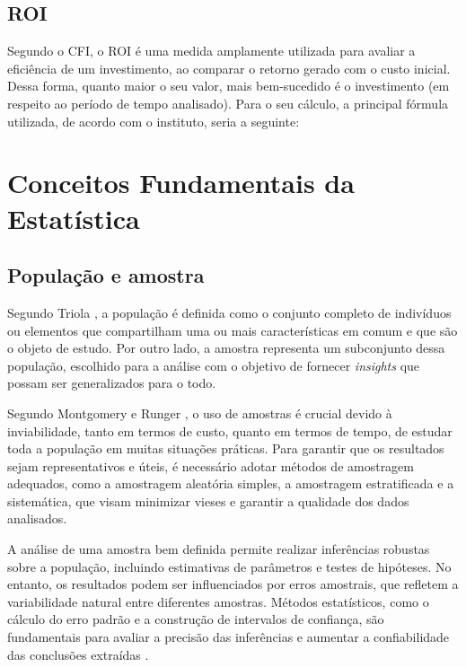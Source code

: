 %

\subsection{\acrfull{ROI}}
Segundo o \acrfull{CFI}\cite{cfiRoi}, o \acrshort{ROI} é uma medida amplamente utilizada para avaliar a eficiência de um investimento, ao comparar o retorno gerado com o custo inicial. Dessa forma, quanto maior o seu valor, mais bem-sucedido é o investimento (em respeito ao período de tempo analisado). Para o seu cálculo, a principal fórmula utilizada, de acordo com o instituto, seria a seguinte:

%

\section{Conceitos Fundamentais da Estatística}
\subsection{População e amostra}
Segundo Triola \cite{triola2018introducao}, a população é definida como o conjunto completo de indivíduos ou elementos que compartilham uma ou mais características em comum e que são o objeto de estudo. Por outro lado, a amostra representa um subconjunto dessa população, escolhido para a análise com o objetivo de fornecer \textit{insights} que possam ser generalizados para o todo.

Segundo Montgomery e Runger \cite{montgomery2014applied}, o uso de amostras é crucial devido à inviabilidade, tanto em termos de custo, quanto em termos de tempo, de estudar toda a população em muitas situações práticas. Para garantir que os resultados sejam representativos e úteis, é necessário adotar métodos de amostragem adequados, como a amostragem aleatória simples, a amostragem estratificada e a sistemática, que visam minimizar vieses e garantir a qualidade dos dados analisados.

A análise de uma amostra bem definida permite realizar inferências robustas sobre a população, incluindo estimativas de parâmetros e testes de hipóteses. No entanto, os resultados podem ser influenciados por erros amostrais, que refletem a variabilidade natural entre diferentes amostras. Métodos estatísticos, como o cálculo do erro padrão e a construção de intervalos de confiança, são fundamentais para avaliar a precisão das inferências e aumentar a confiabilidade das conclusões extraídas \cite{hair2019multivariate}.

